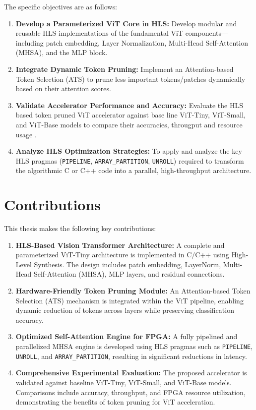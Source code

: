 The specific objectives are as follows:
\begin{enumerate}
    \item \textbf{Develop a Parameterized ViT Core in HLS:}  Develop modular and reusable HLS implementations of the fundamental ViT components—including patch embedding, Layer Normalization, Multi-Head Self-Attention (MHSA), and the MLP block.
    \item \textbf{Integrate Dynamic Token Pruning:} Implement an Attention-based Token Selection (ATS) to prune less important tokens/patches dynamically based on their attention scores.
    \item \textbf{Validate Accelerator Performance and Accuracy:} Evaluate the HLS based token pruned ViT accelerator against base line ViT-Tiny, ViT-Small, and ViT-Base models  to compare their accuracies, througput and resource usage .
    \item \textbf{Analyze HLS Optimization Strategies:} To apply and analyze the key HLS pragmas (\texttt{PIPELINE}, \texttt{ARRAY\_PARTITION}, \texttt{UNROLL}) required to transform the algorithmic C or C++ code into a parallel, high-throughput architecture.
\end{enumerate}

\section{Contributions}

This thesis makes the following key contributions:

\begin{enumerate}
    \item \textbf{HLS-Based Vision Transformer Architecture:}
    A complete and parameterized ViT-Tiny architecture is implemented in C/C++ using High-Level Synthesis. The design includes patch embedding, LayerNorm, Multi-Head Self-Attention (MHSA), MLP layers, and residual connections.

    \item \textbf{Hardware-Friendly Token Pruning Module:}
    An Attention-based Token Selection (ATS) mechanism is integrated within the ViT pipeline, enabling dynamic reduction of tokens across layers while preserving classification accuracy.

    \item \textbf{Optimized Self-Attention Engine for FPGA:}
    A fully pipelined and parallelized MHSA engine is developed using HLS pragmas such as \texttt{PIPELINE}, \texttt{UNROLL}, and \texttt{ARRAY\_PARTITION}, resulting in significant reductions in latency.

    \item \textbf{Comprehensive Experimental Evaluation:}
    The proposed accelerator is validated against baseline ViT-Tiny, ViT-Small, and ViT-Base models. Comparisons include accuracy, throughput, and FPGA resource utilization, demonstrating the benefits of token pruning for ViT acceleration.
\end{enumerate}


